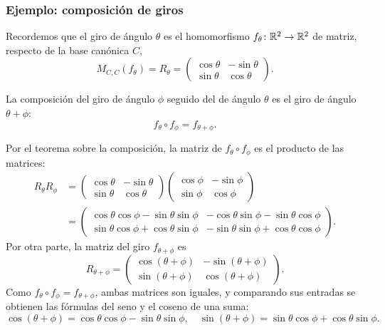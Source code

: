 \begin{frame}[allowframebreaks, t]
    \frametitle{Ejemplo: composición de giros}

    Recordemos que el giro de ángulo $\theta$ es el homomorfismo
    $f_\theta\colon\mathbb{R}^2\to\mathbb{R}^2$ de matriz, respecto de la base canónica $C$,
    \[
        M_{C,C}(f_\theta)=R_\theta=\begin{pmatrix}
            \cos\theta&-\sin\theta\\\sin\theta&\cos\theta
        \end{pmatrix}.
    \]

    \begin{example}
        La composición del giro de ángulo $\phi$ seguido del de ángulo
        $\theta$ es el giro de ángulo $\theta+\phi$:
        \[
            f_\theta\circ f_\phi=f_{\theta+\phi}.
        \]
    \end{example}

    \framebreak

    Por el teorema sobre la composición, la matriz de $f_\theta\circ f_\phi$
    es el producto de las matrices:
    \begin{align*}
        R_\theta R_\phi
        &=\begin{pmatrix}
            \cos\theta&-\sin\theta\\\sin\theta&\cos\theta
        \end{pmatrix}
        \begin{pmatrix}
            \cos\phi&-\sin\phi\\\sin\phi&\cos\phi
        \end{pmatrix}\\[1ex]
        &=\begin{pmatrix}
            \cos\theta\cos\phi-\sin\theta\sin\phi
            &-\cos\theta\sin\phi-\sin\theta\cos\phi\\
            \sin\theta\cos\phi+\cos\theta\sin\phi
            &-\sin\theta\sin\phi+\cos\theta\cos\phi
        \end{pmatrix}.
    \end{align*}
    Por otra parte, la matriz del giro $f_{\theta+\phi}$ es
    \[
        R_{\theta+\phi}=\begin{pmatrix}
            \cos(\theta+\phi)&-\sin(\theta+\phi)\\
            \sin(\theta+\phi)&\cos(\theta+\phi)
        \end{pmatrix}.
    \]
    Como $f_\theta\circ f_\phi=f_{\theta+\phi}$, ambas matrices son
    iguales, y comparando sus entradas se obtienen las fórmulas del seno y
    el coseno de una suma:
    \[
        \cos(\theta+\phi)=\cos\theta\cos\phi-\sin\theta\sin\phi,
        \quad
        \sin(\theta+\phi)=\sin\theta\cos\phi+\cos\theta\sin\phi.
    \]
\end{frame}


